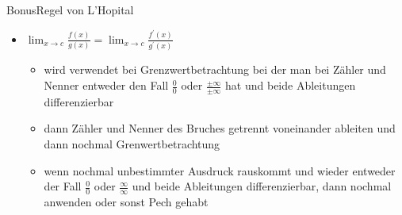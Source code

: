 \begin{frame}{Bonus}{Regel von L'Hopital}
  \begin{itemize}
    \item $\displaystyle \operatorname*{lim}_{x\to c}{\frac{f(x)}{g(x)}}=\operatorname*{lim}_{x\to c}{\frac{f^{\prime}(x)}{g^{\prime}(x)}}$
    \begin{itemize}
      \item wird verwendet bei Grenzwertbetrachtung bei der man bei Zähler und Nenner entweder den Fall $\frac{0}{0}$ oder $\frac{\pm\infty}{\pm\infty}$ hat und beide Ableitungen differenzierbar %
      \item dann Zähler und Nenner des Bruches getrennt voneinander ableiten und dann nochmal Grenwertbetrachtung
      \item wenn nochmal unbestimmter Ausdruck rauskommt und wieder entweder der Fall $\frac{0}{0}$ oder $\frac{\infty}{\infty}$ und beide Ableitungen differenzierbar, dann nochmal anwenden oder sonst Pech gehabt
    \end{itemize}
  \end{itemize}
\end{frame}
